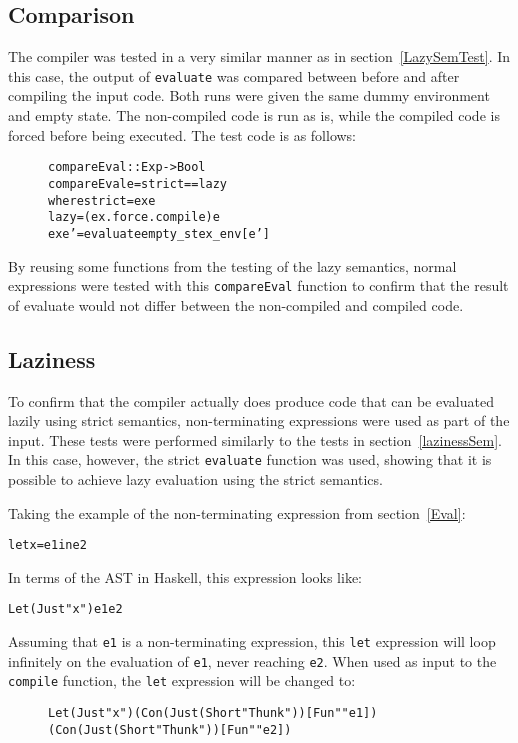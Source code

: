 \subsection{Comparison}

The compiler was tested in a very similar manner as in
section~\ref{LazySemTest}. In this case, the output of \texttt{evaluate}
was compared between
before and after compiling the input code. Both runs were given the same
dummy environment and empty state. The non-compiled code is run as is, while
the compiled code is forced before being executed.
The test code is as follows:

\begin{figure}[!ht]
\begin{alltt}
compareEval :: Exp -> Bool
compareEval e = strict == lazy
  where strict = ex e
        lazy   = (ex . force . compile) e
        ex e'  = evaluate empty_st ex_env [e']
\end{alltt}
\end{figure}

\noindent By reusing some functions from the testing of the lazy semantics,
normal expressions were tested with this \texttt{compareEval}
function to confirm that the result of evaluate would not differ between the
non-compiled and compiled code.


\subsection{Laziness}

To confirm that the compiler actually does produce code that can be evaluated
lazily using strict semantics, non-terminating expressions were used as part
of the input. These tests were performed similarly to the tests in
section~\ref{lazinessSem}. In this case, however, the strict \texttt{evaluate}
function was used, showing that it is possible to achieve lazy evaluation
using the strict semantics.

Taking the example of the non-terminating expression from section~\ref{Eval}:
\begin{alltt}
  let x = e1 in e2
\end{alltt}
In terms of the AST in Haskell, this expression looks like:
\begin{alltt}
  Let (Just "x") e1 e2
\end{alltt}
Assuming that \texttt{e1} is a non-terminating expression, this \texttt{let}
expression will loop infinitely on the evaluation of \texttt{e1}, never reaching
\texttt{e2}. When used as input to the \texttt{compile} function, the
\texttt{let} expression will be changed to:
\begin{figure}[!ht]
\begin{alltt}
  Let (Just "x") (Con (Just (Short "Thunk")) [Fun "" e1])
                 (Con (Just (Short "Thunk")) [Fun "" e2])
\end{alltt}
\end{figure}

